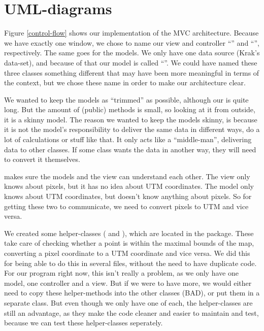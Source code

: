 \chapter{UML-diagrams}
\label{UML}

Figure \ref{control-flow} shows our implementation of the MVC architecture.
Because we have exactly one window, we chose to name our view and controller ``'' and 
``'', respectively. The same goes for the models. We only have one data 
source (Krak's data-set), and because of that our model is called ``''. We could 
have named these three classes something different that may have been more meaningful 
in terms of the  context, but we chose these name in order to make 
our architecture clear.

We wanted to keep the models as ``trimmed'' as possible, although our
 is quite long. But the amount of (public) methods is small, so
looking at it from outside, it is a skinny model. The reason we wanted to keep
the models skinny, is because it is not the model's responsibility to deliver
the same data in different ways, do a lot of calculations or stuff like that. It
only acts like a ``middle-man'', delivering data to other classes. If some class
wants the data in another way, they will need to convert it themselves.

 makes sure the models and the view can understand each other. The view 
only knows about pixels, but it has no idea about UTM coordinates. The model only knows 
about UTM coordinates, but doesn't know anything about pixels. So for getting these two to 
communicate, we need to convert pixels to UTM and vice versa.

We created some helper-classes ( and ), 
which are located in the  package. These take care of checking whether a point 
is within the maximal bounds of the map, converting a pixel coordinate to a UTM coordinate 
and vice versa. We did this for being able to do this in several files, without the need to have 
duplicate code. For our program right now, this isn't really a problem, as we only have one 
model, one controller and a view. But if we were to have more, we would either need to copy 
these helper-methods into the other classes (BAD), or put them in a separate class. But even 
though we only have one of each, the helper-classes are still an advantage, as
they make the code cleaner and easier to maintain and test, because we can test
these helper-classes seperately.

